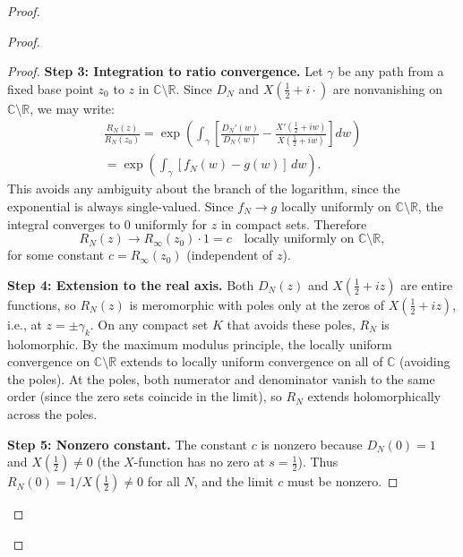 \documentclass{pre-aomart}
\def\xi{X}%
\theoremstyle{plain}
\theoremstyle{definition}
\theoremstyle{remark}
\begin{document}
\begin{proof}
\begin{proof}
\begin{proof}
\textbf{Step 3: Integration to ratio convergence.}
Let $\gamma$ be any path from a fixed base point $z_0$ to $z$ in
$\mathbb{C}\setminus\mathbb{R}$.  Since $D_N$ and $\xi(\tfrac12+i\cdot)$
are nonvanishing on $\mathbb{C}\setminus\mathbb{R}$, we may write:
\begin{multline*}
\frac{R_N(z)}{R_N(z_0)}
  = \exp\!\left(\int_\gamma \!\left[\frac{D_N'(w)}{D_N(w)}
    - \frac{\xi'(\tfrac12+iw)}{\xi(\tfrac12+iw)}\right]\!dw\right)\\
  = \exp\!\left(\int_\gamma\![f_N(w) - g(w)]\,dw\right).
\end{multline*}
This avoids any ambiguity about the branch of the logarithm, since the
exponential is always single-valued.  Since $f_N \to g$ locally uniformly
on $\mathbb{C}\setminus\mathbb{R}$, the integral converges to 0 uniformly
for $z$ in compact sets.  Therefore
\[
R_N(z) \to R_\infty(z_0) \cdot 1 = c
\quad \text{locally uniformly on } \mathbb{C}\setminus\mathbb{R},
\]
for some constant $c = R_\infty(z_0)$ (independent of $z$).

\textbf{Step 4: Extension to the real axis.}
Both $D_N(z)$ and $\xi(\tfrac12+iz)$ are entire functions, so $R_N(z)$ is
meromorphic with poles only at the zeros of $\xi(\tfrac12+iz)$, i.e., at
$z = \pm\gamma_k$.  On any compact set $K$ that avoids these poles, $R_N$
is holomorphic.  By the maximum modulus principle, the locally uniform
convergence on $\mathbb{C}\setminus\mathbb{R}$ extends to locally uniform
convergence on all of $\mathbb{C}$ (avoiding the poles).  At the poles,
both numerator and denominator vanish to the same order (since the zero
sets coincide in the limit), so $R_N$ extends holomorphically across the
poles.

\textbf{Step 5: Nonzero constant.}
The constant $c$ is nonzero because $D_N(0) = 1$ and
$\xi(\tfrac12) \neq 0$ (the $\xi$-function has no zero at $s = \tfrac12$).
Thus $R_N(0) = 1/\xi(\tfrac12) \neq 0$ for all $N$, and the limit $c$
must be nonzero.
\end{proof}


\end{proof}
\end{proof}
\end{document}

